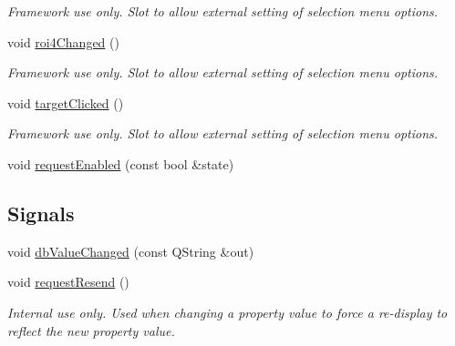 \begin{DoxyCompactItemize}
\begin{DoxyCompactList}\small\item\em Framework use only. Slot to allow external setting of selection menu options. \end{DoxyCompactList}\item 
\hypertarget{classQEImage_aad3ea946132acd2117c0ff890bf95cb9}{
void \hyperlink{classQEImage_aad3ea946132acd2117c0ff890bf95cb9}{roi4Changed} ()}
\label{classQEImage_aad3ea946132acd2117c0ff890bf95cb9}

\begin{DoxyCompactList}\small\item\em Framework use only. Slot to allow external setting of selection menu options. \end{DoxyCompactList}\item 
\hypertarget{classQEImage_aef1828fb114ace508aa494e6f9481ce7}{
void \hyperlink{classQEImage_aef1828fb114ace508aa494e6f9481ce7}{targetClicked} ()}
\label{classQEImage_aef1828fb114ace508aa494e6f9481ce7}

\begin{DoxyCompactList}\small\item\em Framework use only. Slot to allow external setting of selection menu options. \end{DoxyCompactList}\item 
void \hyperlink{classQEImage_ad66a2e82e798bdef7f4ad5e44a3c3d05}{requestEnabled} (const bool \&state)
\end{DoxyCompactItemize}
\subsection*{Signals}
\begin{DoxyCompactItemize}
\item 
void \hyperlink{classQEImage_a3123e5a625c153c0a14022e77a856faf}{dbValueChanged} (const QString \&out)
\item 
\hypertarget{classQEImage_ac0b1b4c3dc4aa7821e5f12c57612b467}{
void \hyperlink{classQEImage_ac0b1b4c3dc4aa7821e5f12c57612b467}{requestResend} ()}
\label{classQEImage_ac0b1b4c3dc4aa7821e5f12c57612b467}

\begin{DoxyCompactList}\small\item\em Internal use only. Used when changing a property value to force a re-\/display to reflect the new property value. \end{DoxyCompactList}\end{DoxyCompactItemize}
